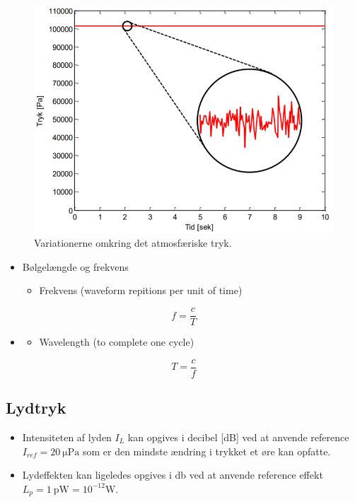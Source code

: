 \begin{figure} [H]
	\centering
	\includegraphics[width=0.85\linewidth]{graphics/44.png}
	\caption{Variationerne omkring det atmosfæriske tryk.}
	\label{fig:44}
\end{figure}

\begin{itemize}
	\item Bølgelængde og frekvens
	\begin{itemize}
		\item Frekvens (waveform repitions per unit of time) 
	\end{itemize}
\end{itemize}
\begin{equation}\label{eq:freq}
f = \frac{c}{T}
\end{equation}
\begin{itemize}
	\item[] 
	\begin{itemize}
		\item Wavelength (to complete one cycle) 
	\end{itemize}
\end{itemize}
\begin{equation}\label{eq:wave}
T = \frac{c}{f}
\end{equation}

\subsection{Lydtryk}
\begin{itemize}
	\item Intensiteten af lyden $I_L$ kan opgives i decibel [dB] ved at anvende reference $I_{ref} = \SI{20}{\micro\pascal}$ som er den mindste ændring i trykket et øre kan opfatte.
	\item Lydeffekten kan ligeledes opgives i \si{\decibel} ved at anvende reference effekt $L_p = \SI{1}{\pico\watt} = 10^{-12} \si{\watt}$.
\end{itemize}

